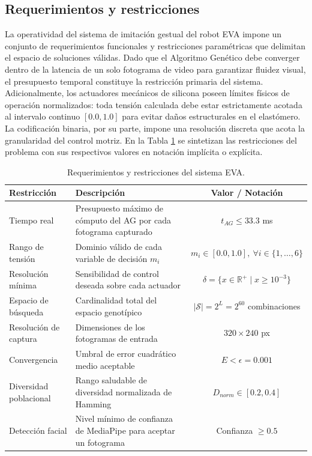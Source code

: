 \subsection{Requerimientos y restricciones}

La operatividad del sistema de imitación gestual del robot EVA impone un conjunto de requerimientos funcionales y restricciones paramétricas que delimitan el espacio de soluciones válidas. Dado que el Algoritmo Genético debe converger dentro de la latencia de un solo fotograma de video para garantizar fluidez visual, el presupuesto temporal constituye la restricción primaria del sistema. Adicionalmente, los actuadores mecánicos de silicona poseen límites físicos de operación normalizados: toda tensión calculada debe estar estrictamente acotada al intervalo continuo $[0.0, 1.0]$ para evitar daños estructurales en el elastómero. La codificación binaria, por su parte, impone una resolución discreta que acota la granularidad del control motriz. En la Tabla \ref{TBL_Requerimientos} se sintetizan las restricciones del problema con sus respectivos valores en notación implícita o explícita.

\begin{table}[H]
    \centering
    \footnotesize
    \begin{tabularx}{\textwidth}{|l|X|c|}
        \hline
        \textbf{Restricción} & \textbf{Descripción} & \textbf{Valor / Notación} \\
        \hline
        Tiempo real & Presupuesto máximo de cómputo del AG por cada fotograma capturado & $t_{AG} \leq 33.3$ ms \\
        \hline
        Rango de tensión & Dominio válido de cada variable de decisión $m_i$ & $m_i \in [0.0, 1.0],\ \forall i \in \{1, \dots, 6\}$ \\
        \hline
        Resolución mínima & Sensibilidad de control deseada sobre cada actuador & $\delta = \{x \in \mathbb{R}^+ \mid x \geq 10^{-3}\}$ \\
        \hline
        Espacio de búsqueda & Cardinalidad total del espacio genotípico & $|\mathcal{S}| = 2^{L} = 2^{60}$ combinaciones \\
        \hline
        Resolución de captura & Dimensiones de los fotogramas de entrada & $320 \times 240$ px \\
        \hline
        Convergencia & Umbral de error cuadrático medio aceptable & $E < \epsilon = 0.001$ \\
        \hline
        Diversidad poblacional & Rango saludable de diversidad normalizada de Hamming & $D_{norm} \in [0.2, 0.4]$ \\
        \hline
        Detección facial & Nivel mínimo de confianza de MediaPipe para aceptar un fotograma & Confianza $\geq 0.5$ \\
        \hline
    \end{tabularx}
    \caption{Requerimientos y restricciones del sistema EVA.}
    \label{TBL_Requerimientos}
\end{table}


